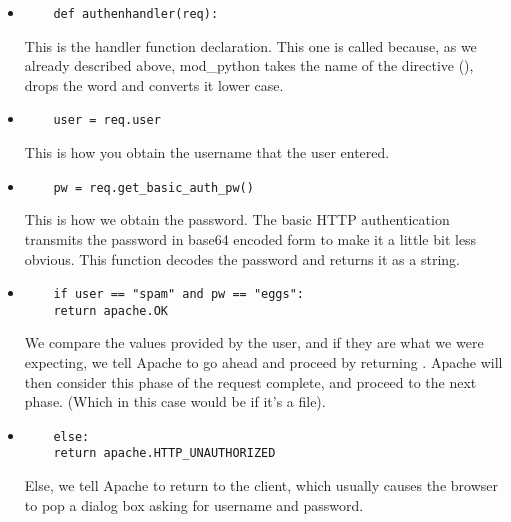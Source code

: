 \begin{itemize}

\item
  \begin{verbatim}
    def authenhandler(req):
  \end{verbatim}

  This is the handler function declaration. This one is called
   because, as we already described above,
  mod_python takes the name of the directive
  (), drops the word  and converts
  it lower case.

\item
  \begin{verbatim}
    user = req.user
  \end{verbatim}
  
  This is how you obtain the username that the user entered. 

\item
  \begin{verbatim}
    pw = req.get_basic_auth_pw()
  \end{verbatim}
  
  This is how we obtain the password. The basic HTTP authentication
  transmits the password in base64 encoded form to make it a little
  bit less obvious. This function decodes the password and returns it
  as a string.

\item
  \begin{verbatim}
    if user == "spam" and pw == "eggs":
    return apache.OK
  \end{verbatim}

  We compare the values provided by the user, and if they are what we
  were expecting, we tell Apache to go ahead and proceed by returning
  . Apache will then consider this phase of the
  request complete, and proceed to the next phase. (Which in this case
  would be  if it's a  file).

\item
  \begin{verbatim}
    else:
    return apache.HTTP_UNAUTHORIZED 
  \end{verbatim}

  Else, we tell Apache to return  to the
  client, which usually causes the browser to pop a dialog box asking
  for username and password.

\end{itemize}

